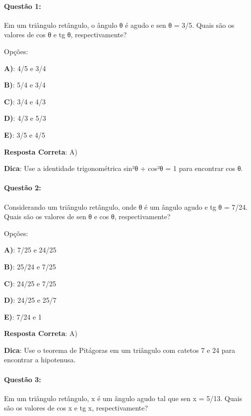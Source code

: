 \documentclass{article}
\begin{document}
\paragraph{Questão 1:}
{Em um triângulo retângulo, o ângulo θ é agudo e sen θ = 3/5. Quais são os valores de cos θ e tg θ, respectivamente?}

\vspace{\baselineskip}Opções:

\vspace{\baselineskip}\textbf{A)}: 4/5 e 3/4 

\textbf{B)}: 5/4 e 3/4 

\textbf{C)}: 3/4 e 4/3 

\textbf{D)}: 4/3 e 5/3 

\textbf{E)}: 3/5 e 4/5 

\vspace{\baselineskip}\textbf{Resposta Correta}: A)

\vspace{\baselineskip}\textbf{Dica}: Use a identidade trigonométrica sin²θ + cos²θ = 1 para encontrar cos θ.

\paragraph{Questão 2:}
{Considerando um triângulo retângulo, onde θ é um ângulo agudo e tg θ = 7/24. Quais são os valores de sen θ e cos θ, respectivamente?}

\vspace{\baselineskip}Opções:

\vspace{\baselineskip}\textbf{A)}: 7/25 e 24/25 

\textbf{B)}: 25/24 e 7/25 

\textbf{C)}: 24/25 e 7/25 

\textbf{D)}: 24/25 e 25/7 

\textbf{E)}: 7/24 e 1 

\vspace{\baselineskip}\textbf{Resposta Correta}: A)

\vspace{\baselineskip}\textbf{Dica}: Use o teorema de Pitágoras em um triângulo com catetos 7 e 24 para encontrar a hipotenusa.

\paragraph{Questão 3:}
{Em um triângulo retângulo, x é um ângulo agudo tal que sen x = 5/13. Quais são os valores de cos x e tg x, respectivamente?}
\end{document}
